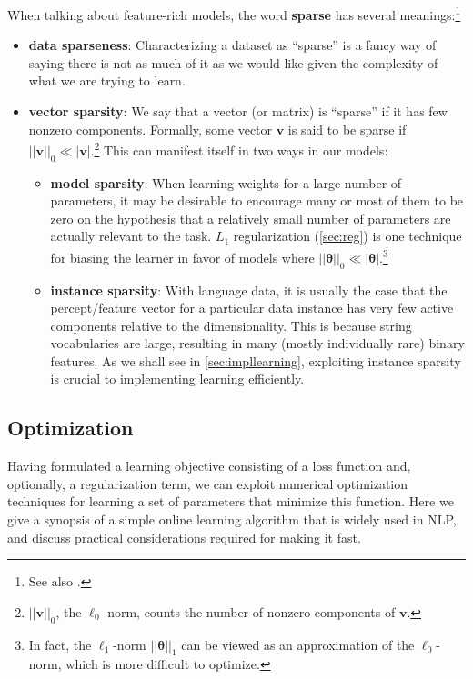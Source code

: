 \documentclass[11pt,letterpaper]{article}
\begin{document}
When talking about feature-rich models, the word \textbf{sparse} has several meanings:\footnote{See also \citet[slide~7]{martins-tutorial}.}
\begin{itemize}
  \item \textbf{data sparseness}: Characterizing a dataset as ``sparse'' is a fancy way of saying there is not as much of it as we would like 
  given the complexity of what we are trying to learn.
  \item \textbf{vector sparsity}: We say that a vector (or matrix) is ``sparse'' if it has few nonzero components.
  Formally, some vector $\mathbf{v}$ is said to be sparse if $||\mathbf{v}||_0 \ll |\mathbf{v}|$.\footnote{$||\mathbf{v}||_0$, the $\ell_0$-norm, counts the number of nonzero components of $\mathbf{v}$.} 
  This can manifest itself in two ways in our models:
  \begin{itemize}
  	\item \textbf{model sparsity}: When learning weights for a large number of parameters, it may be desirable to encourage
  many or most of them to be zero on the hypothesis that a relatively small number of parameters are actually 
  relevant to the task. 
  $L_1$ regularization (\cref{sec:reg}) is one technique for biasing the learner in favor of models where 
  $||\boldsymbol{\theta}||_0 \ll |\boldsymbol{\theta}|$.\footnote{In fact, the $\ell_1$-norm $||\boldsymbol{\theta}||_1$ can be viewed as an approximation of the $\ell_0$-norm, 
  which is more difficult to optimize.}
	  \item \textbf{instance sparsity}: With language data, it is usually the case that the percept\slash feature 
  vector for a particular data instance has very few active components relative to the dimensionality.
  This is because string vocabularies are large, resulting in many (mostly individually rare) binary features.  
  As we shall see in \cref{sec:impllearning}, exploiting instance sparsity is crucial to implementing learning efficiently.
  \end{itemize} 
\end{itemize}

\subsection{Optimization}

Having formulated a learning objective consisting of a loss function and, optionally, a regularization term, 
we can exploit numerical optimization techniques for learning a set of parameters that minimize this function.
Here we give a synopsis of a simple online learning algorithm that is widely used in NLP, 
and discuss practical considerations required for making it fast.
\end{document}
